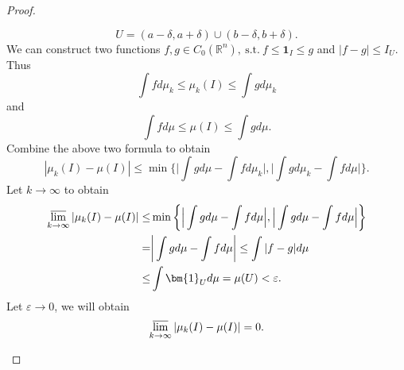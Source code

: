 \documentclass[12pt]{article}
\renewcommand{\i}{\bm{1}}
\renewcommand{\(}{\left(}%
\renewcommand{\)}{\right)}%
\renewcommand{\[}{\left[}%
\renewcommand{\]}{\right]}%
\renewcommand{\r}{\mathbb{R}}
\newcommand{\st}{\mathrm{\ s.t.\ }}
\newtheorem{proof}{Proof.}}
\begin{document}
\begin{proof}
\begin{enumerate}[\itshape (1)]
    \begin{equation*}
     U=(a-\delta,a+\delta )\cup (b-\delta,b+\delta ).
    \end{equation*} 
     We can construct two functions $f,g\in C_0(\r^n),\st f\leq \i_I\leq g$ and $|f-g|\leq I_U$. Thus
     \begin{equation*}
      \int fd\mu_k \leq \mu_k(I)\leq \int gd\mu_k
     \end{equation*}
     and
     \begin{equation*}
      \int fd\mu \leq \mu(I)\leq \int gd\mu.
     \end{equation*}
     Combine the above two formula to obtain
     \begin{equation*}
      |\mu_k(I)-\mu(I)|\leq \min\bigg\{\Big| \int gd\mu-\int fd\mu_k\Big|,\Big|\int gd\mu_k-\int fd\mu\Big| \bigg\}.
     \end{equation*} 
     Let $k\to\infty$ to obtain
     \begin{equation*}
      \begin{split}
       \varlimsup_{k\to\infty}|\mu_k(I)-\mu(I)|\leq&\min\bigg\{\Big|\int gd\mu-\int fd\mu\Big|,\Big|\int gd\mu-\int fd\mu\Big| \bigg\}\\
       =&\bigg|\int gd\mu-\int fd\mu\bigg|\leq \int |f-g|d\mu\\
       \leq &\int \i_Ud\mu=\mu(U)<\varepsilon.
      \end{split}
     \end{equation*}
     Let $\varepsilon\to0$, we will obtain 
     \begin{equation*}
      \varlimsup_{k\to\infty}|\mu_k(I)-\mu(I)|=0.
     \end{equation*}
   \end{enumerate}
  \end{proof}
  
\end{document}
